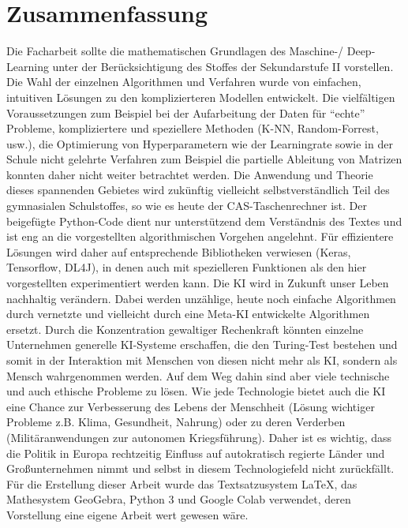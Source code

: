 \documentclass[a4paper]{scrreprt}
\begin{document}
 
\chapter{Zusammenfassung}
Die Facharbeit sollte die mathematischen Grundlagen des Maschine-/ Deep-Learning unter der Berücksichtigung des Stoffes der Sekundarstufe II vorstellen. Die Wahl der einzelnen Algorithmen und Verfahren wurde von einfachen, intuitiven Lösungen zu den komplizierteren Modellen entwickelt. Die vielfältigen Voraussetzungen zum Beispiel bei der Aufarbeitung der Daten für ``echte'' Probleme,  kompliziertere und speziellere Methoden (K-NN, Random-Forrest, usw.), die Optimierung von Hyperparametern wie der Learningrate sowie in der Schule nicht gelehrte Verfahren zum Beispiel die partielle Ableitung von Matrizen konnten daher nicht weiter betrachtet werden.
Die Anwendung und Theorie dieses spannenden Gebietes wird zukünftig vielleicht selbstverständlich Teil des gymnasialen Schulstoffes, so wie es heute der CAS-Taschenrechner ist. Der beigefügte Python-Code dient nur unterstützend dem Verständnis des Textes und ist eng an die vorgestellten algorithmischen Vorgehen angelehnt. Für effizientere Lösungen wird daher auf entsprechende Bibliotheken verwiesen (Keras, Tensorflow, DL4J), in denen auch mit spezielleren Funktionen als den hier vorgestellten experimentiert werden kann.
Die KI wird in Zukunft unser Leben nachhaltig verändern. Dabei werden unzählige, heute noch einfache Algorithmen durch vernetzte und vielleicht durch eine Meta-KI entwickelte Algorithmen ersetzt. Durch die Konzentration gewaltiger Rechenkraft könnten einzelne Unternehmen generelle KI-Systeme erschaffen, die den Turing-Test bestehen und somit in der Interaktion mit Menschen von diesen nicht mehr als KI, sondern als Mensch wahrgenommen werden. Auf dem Weg dahin sind aber viele technische und auch ethische Probleme zu lösen. Wie jede Technologie bietet auch die KI eine Chance zur Verbesserung des Lebens der Menschheit (Lösung wichtiger Probleme z.B. Klima, Gesundheit, Nahrung) oder zu deren Verderben (Militäranwendungen zur autonomen Kriegsführung). Daher ist es wichtig, dass die Politik in Europa rechtzeitig Einfluss auf autokratisch regierte Länder und Großunternehmen nimmt und selbst in diesem Technologiefeld nicht zurückfällt.\newline
Für die Erstellung dieser Arbeit wurde das Textsatzusystem LaTeX, das Mathesystem GeoGebra, Python 3 und Google Colab verwendet, deren Vorstellung eine eigene Arbeit wert gewesen wäre. 
\end{document}
